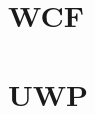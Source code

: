         \paragraph{}
    \section{WCF}
        \paragraph{}
    \section{UWP}
        \paragraph{}


    
